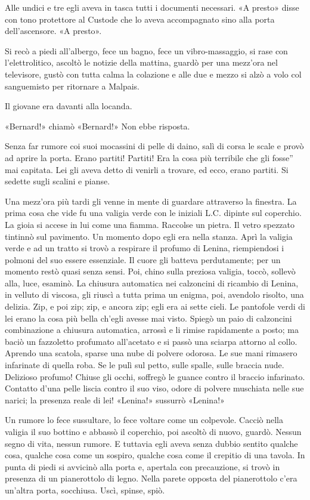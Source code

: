 \documentclass[
a5paper, %
10pt, %
twoside, 
onecolumn, %
openany, %
]{memoir}
\begin{document}
Alle undici e tre egli aveva in tasca tutti i documenti necessari. «A presto» disse con tono protettore al Custode che lo aveva accompagnato sino alla porta dell’ascensore. «A presto».

Si recò a piedi all’albergo, fece un bagno, fece un vibro-massaggio, si rase con l’elettrolitico, ascoltò le notizie della mattina, guardò per una mezz’ora nel televisore, gustò con tutta calma la colazione e alle due e mezzo si alzò a volo col sanguemisto per ritornare a Malpais.

Il giovane era davanti alla locanda.

«Bernard!» chiamò «Bernard!» Non ebbe risposta.

Senza far rumore coi suoi mocassini di pelle di daino, salì di corsa le scale e provò ad aprire la porta. Erano partiti! Partiti! Era la cosa più terribile che gli fosse” mai capitata. Lei gli aveva detto di venirli a trovare, ed ecco, erano partiti. Si sedette sugli scalini e pianse.

Una mezz’ora più tardi gli venne in mente di guardare attraverso la finestra. La prima cosa che vide fu una valigia verde con le iniziali L.C. dipinte sul coperchio. La gioia si accese in lui come una fiamma. Raccolse un pietra. Il vetro spezzato tintinnò sul pavimento. Un momento dopo egli era nella stanza. Aprì la valigia verde e ad un tratto si trovò a respirare il profumo di Lenina, riempiendosi i polmoni del suo essere essenziale. Il cuore gli batteva perdutamente; per un momento restò quasi senza sensi. Poi, chino sulla preziosa valigia, toccò, sollevò alla, luce, esaminò. La chiusura automatica nei calzoncini di ricambio di Lenina, in velluto di viscosa, gli riuscì a tutta prima un enigma, poi, avendolo risolto, una delizia. Zip, e poi zip; zip, e ancora zip; egli era ai sette cieli. Le pantofole verdi di lei erano la cosa più bella ch’egli avesse mai visto. Spiegò un paio di calzoncini combinazione a chiusura automatica, arrossì e li rimise rapidamente a posto; ma baciò un fazzoletto profumato all’acetato e si passò una sciarpa attorno al collo. Aprendo una scatola, sparse una nube di polvere odorosa. Le sue mani rimasero infarinate di quella roba. Se le pulì sul petto, sulle spalle, sulle braccia nude. Delizioso profumo! Chiuse gli occhi, soffregò le guance contro il braccio infarinato. Contatto d’una pelle liscia contro il suo viso, odore di polvere muschiata nelle sue narici; la presenza reale di lei! «Lenina!» sussurrò «Lenina!»

Un rumore lo fece sussultare, lo fece voltare come un colpevole. Cacciò nella valigia il suo bottino e abbassò il coperchio, poi ascoltò di nuovo, guardò. Nessun segno di vita, nessun rumore. E tuttavia egli aveva senza dubbio sentito qualche cosa, qualche cosa come un sospiro, qualche cosa come il crepitio di una tavola. In punta di piedi si avvicinò alla porta e, apertala con precauzione, si trovò in presenza di un pianerottolo di legno. Nella parete opposta del pianerottolo c’era un’altra porta, socchiusa. Uscì, spinse, spiò.
\end{document}

